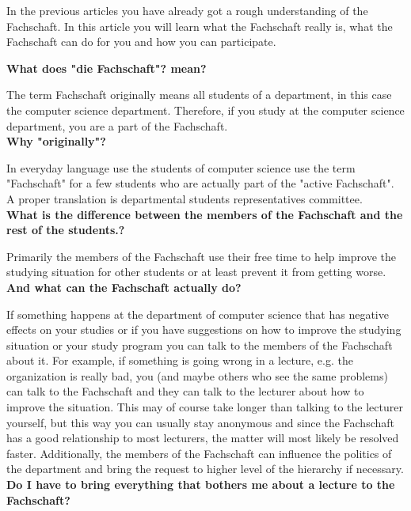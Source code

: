 {In the previous articles you have already got a rough understanding of the Fachschaft. In this article you will learn what the Fachschaft really is, what the Fachschaft can do for you and how you can participate.
}{
\label{FSarticle}
\textbf{What does "die Fachschaft"? mean?}

The term Fachschaft originally means all students of a department, in this case the computer science department. Therefore, if you study at the computer science department, you are a part of the Fachschaft.\\

\textbf{Why "originally"?}

In everyday language use the students of computer science use the term "Fachschaft" for a few students who are actually part of the "active Fachschaft". A proper translation is departmental students representatives committee.\\

\textbf{What is the difference between the members of the Fachschaft and the rest of the students.?}

Primarily the members of the Fachschaft use their free time to help improve the studying situation for other students or at least prevent it from getting worse.\\

\textbf{And what can the Fachschaft actually do?}

If something happens at the department of computer science that has negative effects on your studies or if you have suggestions on how to improve the studying situation or your study program you can talk to the members of the Fachschaft about it. For example, if something is going wrong in a lecture, e.g. the organization is really bad, you (and maybe others who see the same problems) can talk to the Fachschaft and they can talk to the lecturer about how to improve the situation. This may of course take longer than talking to the lecturer yourself, but this way you can usually stay anonymous and since the Fachschaft has a good relationship to most lecturers, the matter will most likely be resolved faster. Additionally, the members of the Fachschaft can influence the politics of the department and bring the request to higher level of the hierarchy if necessary.\\

\textbf{Do I have to bring everything that bothers me about a lecture to the Fachschaft?}

}
